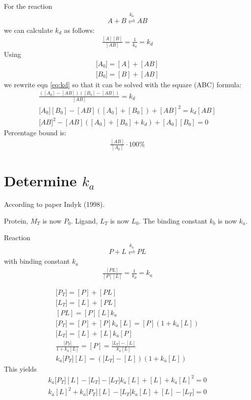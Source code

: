 \documentclass[11pt, fleqn]{report}
\newcommand{\pc}{[P]}
\newcommand{\lc}{[L]}
\newcommand{\plc}{[PL]}
\newcommand{\ka}{k_a}
\newcommand{\pcz}{\lbrack P_T\rbrack}
\newcommand{\lcz}{\lbrack L_T\rbrack}
\begin{document}
For the reaction
\begin{eqnarray}
A+B \stackrel{k_a}{\rightleftharpoons} AB
\end{eqnarray}
we can calculate $k_d$ as follows:
\begin{eqnarray}
\frac{[A][B]}{[AB]} = \frac{1}{k_a} = k_d \label{eq:kd}
\end{eqnarray}
Using
\begin{eqnarray}
\lbrack A_0\rbrack = [A] + [AB] \\
\lbrack B_0\rbrack = [B] + [AB] 
\end{eqnarray}
we rewrite eqn \ref{eq:kd} so that it can be solved with the square (ABC) formula:
\begin{eqnarray}
\frac{([A_0]-[AB])([B_0]-[AB])}{[AB]} = k_d \\
\lbrack A_0 \rbrack[B_0]-[AB]([A_0]+[B_0])+[AB]^2= k_d [AB] \\
\lbrack AB \rbrack^2 - [AB]([A_0]+[B_0]+k_d) + [A_0][B_0] = 0
\end{eqnarray}
Percentage bound is:
\begin{eqnarray}
\frac{[AB]}{[A_0]}\cdot 100\%
\end{eqnarray}


\section*{Determine $k_a$}

According to paper Indyk (1998).

Protein, $M_T$ is now $P_0$. Ligand, $L_T$ is now $L_0$. The binding constant $k_b$ is now $k_a$. 

Reaction
\begin{eqnarray}
P+L \stackrel{k_a}{\rightleftharpoons} PL
\end{eqnarray}
with binding constant $k_a$
\begin{eqnarray}
\frac{\plc}{\pc \lc} = \frac{1}{k_d} = k_a \label{eq:ka}
\end{eqnarray}

\begin{eqnarray}
\pcz = \pc + \plc \\
\lcz = \lc + \plc \\
\plc = \pc \lc \ka \\
\pcz = \pc + \pc \ka \lc = \pc(1+\ka\lc)\\
\lcz = \lc + \lc \ka \pc \\
\frac{\pcz}{1+\ka\lc} = \pc = \frac{\lcz-\lc}{\ka\lc} \\
\ka\pcz\lc = (\lcz-\lc)(1+\ka\lc)
\end{eqnarray}
This yields
\begin{eqnarray}
\ka\pcz\lc - \lcz - \lcz\ka\lc + \lc + \ka\lc^2 = 0 \\
\ka\lc^2 + \ka\pcz\lc - \lcz\ka\lc + \lc - \lcz = 0 
\end{eqnarray}
\end{document}
